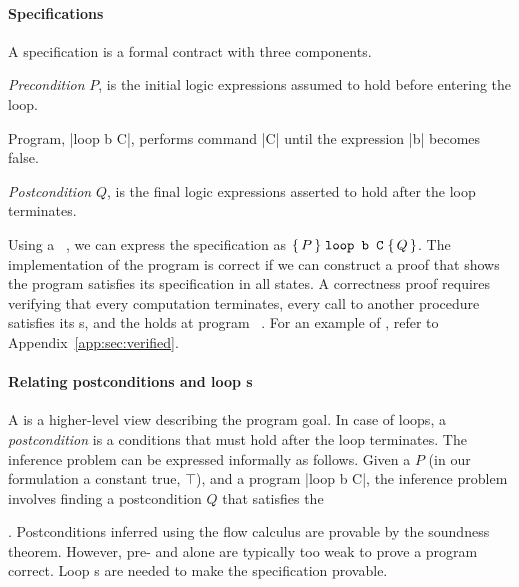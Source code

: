 \paragraph*{Specifications}
A {specification} is a formal contract with three
components.
\begin{enumerate*}

    \item \emph{Precondition} \(P\), is the initial logic
expressions assumed to hold before entering the loop.

\item Program, \pr|loop b C|, performs command \pr|C| until the expression
\pr|b| becomes false.

\item \emph{Postcondition} \(Q\), is the final logic
expressions asserted to hold after the loop terminates.

\end{enumerate*}

Using a ~\cite{hoare1969}, we can express the specification as
\(\Hoare{P}{\prm{loop b C}}{Q}\). The implementation of the program is correct
if we can construct a proof that shows the program satisfies its specification
in all states. A correctness proof requires verifying that every computation
terminates, every call to another procedure satisfies its
s, and the  holds at program
~\cite{furia2010}. For an example of ,
refer to Appendix~\ref{app:sec:verified}.

\paragraph*{Relating postconditions and loop s}
A  is a higher-level view describing the program goal. In
case of loops, a \emph{postcondition} is a conditions that must hold after the
loop terminates. The  inference problem
can be expressed informally as follows. Given a 
\(P\) (in our formulation a constant true, \(\top\)),
and a program \pr|loop b C|, the inference problem involves finding a
postcondition \(Q\) that satisfies the 
\begin{prooftree} %
\end{prooftree}.
Postconditions inferred using the flow calculus are provable
by the soundness theorem. However, pre- and
 alone are typically too weak to prove a program correct.
Loop s are needed to make the specification
provable.

